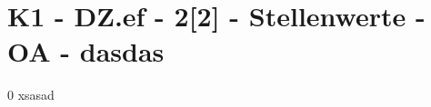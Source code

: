 \section{K1 - DZ.ef - 2[2] - Stellenwerte - OA - dasdas}

\begin{langesbeispiel}\item[0] %
xsasad

\end{langesbeispiel}